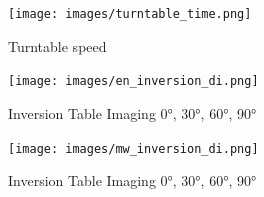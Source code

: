 \begin{figure}[!htb]
        \caption{Turntable speed}
        \centering
        \texttt{[image: images/turntable\_time.png]}
\end{figure}

\begin{figure}[!htb]
        \caption{Inversion Table Imaging \ang{0}, \ang{30}, \ang{60}, \ang{90}}
        \centering
        \texttt{[image: images/en\_inversion\_di.png]}
\end{figure}
\begin{figure}[!htb]
        \caption{Inversion Table Imaging \ang{0}, \ang{30}, \ang{60}, \ang{90}}
        \centering
        \texttt{[image: images/mw\_inversion\_di.png]}
\end{figure}
